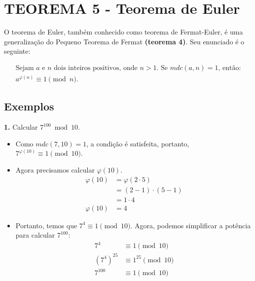\section{TEOREMA 5 - Teorema de Euler}
O teorema de Euler, também conhecido como teorema de Fermat-Euler, é uma generalização do Pequeno Teorema de Fermat \textbf{(teorema 4)}. Seu enunciado é o seguinte:

\begin{gather*}
    \text{Sejam $a$ e $n$ dois inteiros positivos, onde $n>1$. Se $mdc(a,n) = 1$, então:}\\
    a^{\varphi(n)} \equiv 1 \pmod {n}\text{.}
\end{gather*}

\vspace{12pt}

\subsection*{Exemplos}
\textbf{1.} Calcular $7^{100} \bmod 10$.

\begin{itemize}
    \item Como $mdc(7,10) = 1$, a condição é satisfeita, portanto, $7^{\varphi(10)} \equiv 1 \pmod {10}$.
    \item Agora precisamos calcular $\varphi(10)$.
          \begin{align*}
              \varphi(10) & = \varphi (2 \cdot 5) \\
                          & = (2-1) \cdot (5-1)   \\
                          & = 1 \cdot 4           \\
              \varphi(10) & = 4
          \end{align*}
    \item Portanto, temos que $7^{4} \equiv 1 \pmod {10}$. Agora, podemos simplificar a potência para calcular $7^{100}$:
          \begin{align*}
              7^{4}        & \equiv 1 \pmod {10}      \\
              (7^{4})^{25} & \equiv 1^{25} \pmod {10} \\
              7^{100}      & \equiv 1 \pmod {10}
          \end{align*}
\end{itemize}